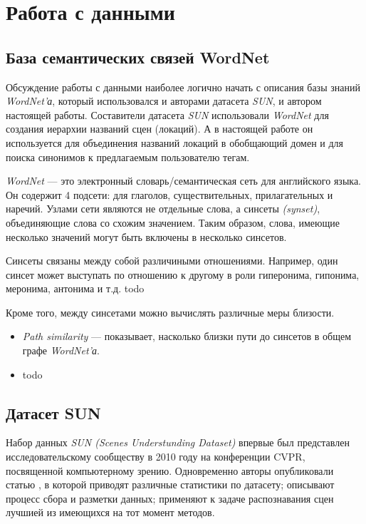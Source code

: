 \section{Работа с данными}


\subsection{База семантических связей WordNet}

\indent
\indent
Обсуждение работы с данными наиболее логично начать с описания базы знаний
\textit{WordNet'а}, который использовался и авторами датасета \textit{SUN},
и автором настоящей работы. Составители датасета \textit{SUN} использовали
\textit{WordNet} для создания иерархии названий сцен (локаций). А в настоящей работе
он используется для объединения названий локаций в обобщающий домен
и для поиска синонимов к предлагаемым пользователю тегам.

\indent
\textit{WordNet} --- это электронный словарь/семантическая сеть для английского
языка. Он содержит 4 подсети: для глаголов, существительных, прилагательных и
наречий. Узлами сети являются не отдельные слова, а синсеты \textit{(synset)},
объединяющие слова со схожим значением. Таким образом, слова, имеющие 
несколько значений могут быть включены в несколько синсетов.

Синсеты связаны между собой различиными отношениями. 
Например, один синсет может выступать по отношению к другому в роли гиперонима, гипонима, меронима, антонима и т.д. todo 

Кроме того, между синсетами можно вычислять различные меры близости.

\begin{itemize}

    \item \textit{Path similarity} --- показывает, насколько близки пути до 
    синсетов в общем графе \textit{WordNet'а}.
    
    \item todo
    
    
\end{itemize}


\subsection{Датасет SUN}

\indent
\indent
Набор данных \textit{SUN (Scenes Understunding Dataset)} впервые был 
представлен исследовательскому сообществу в 2010 году на 
конференции CVPR, посвященной компьютерному зрению. Одновременно
авторы опубликовали статью \cite{sundata}, в которой приводят различные
статистики по датасету; описывают процесс сбора и разметки данных; 
применяют к задаче распознавания сцен лучшией из имеющихся
на тот момент методов. 

